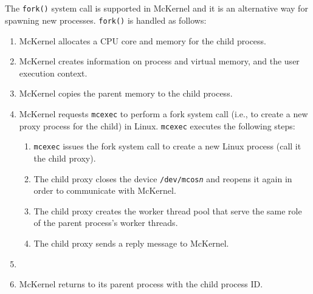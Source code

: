 \documentclass[twoside,11pt,fleqn]{book}
\begin{document}
\subsection{}
\label{sec:fork}
The \texttt{fork()} system call is supported in McKernel and it is an alternative
way for spawning new processes. \texttt{fork()} is handled as follows:

\begin{enumerate}
\item McKernel allocates a CPU core and memory for the child process.
\item McKernel creates information on process and virtual memory,
and the user execution context.
\item McKernel copies the parent memory to the child process.
\item McKernel requests \texttt{mcexec} to perform a fork system call (i.e.,
 to create a new proxy process for the child) in Linux.
 \texttt{mcexec} executes the following steps:
  \begin{enumerate}
  \item \texttt{mcexec} issues the fork system call to create a new Linux
	process (call it the child proxy).
  \item The child proxy closes the device
    \texttt{/dev/mcos\textit{n}} and reopens it again
    in order to communicate with McKernel.
  \item The child proxy creates the worker thread pool that serve the same role
  of the parent process's worker threads.
  \item The child proxy sends a reply message to McKernel.
  \end{enumerate}
\item {}
\item McKernel returns to its parent process with the child process ID.
\end{enumerate}
\end{document}
